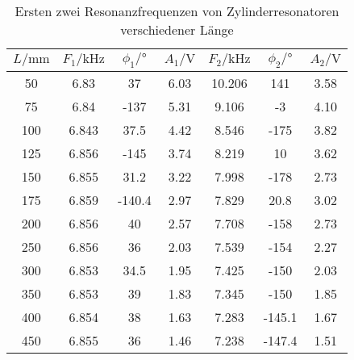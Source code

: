 \begin{table}
    \centering
    \caption{Ersten zwei Resonanzfrequenzen von Zylinderresonatoren verschiedener Länge}
    \label{tab:zylinder}
    \begin{tabular}{c c c c c c c}
        \toprule
        $L/\si{\milli\meter}$ & $F_1/\si{\kilo\hertz}$ & $\phi_1/°$ & $A_1/\si{\volt}$ & $F_2/\si{\kilo\hertz}$ & $\phi_2/°$ & $A_2/\si{\volt}$\\
        \midrule
        50  &6.83    &37      &6.03    &10.206  &141     &3.58\\
        75  &6.84    &-137    &5.31    &9.106   &-3      &4.10\\
        100 &6.843   &37.5    &4.42    &8.546   &-175    &3.82\\
        125 &6.856   &-145    &3.74    &8.219   &10      &3.62\\
        150 &6.855   &31.2    &3.22    &7.998   &-178    &2.73\\
        175 &6.859   &-140.4  &2.97    &7.829   &20.8    &3.02\\
        200 &6.856   &40      &2.57    &7.708   &-158    &2.73\\
        250 &6.856   &36      &2.03    &7.539   &-154    &2.27\\
        300 &6.853   &34.5    &1.95    &7.425   &-150    &2.03\\
        350 &6.853   &39      &1.83    &7.345   &-150    &1.85\\
        400 &6.854   &38      &1.63    &7.283   &-145.1  &1.67\\
        450 &6.855   &36      &1.46    &7.238   &-147.4  &1.51\\
        \bottomrule
    \end{tabular}
\end{table}